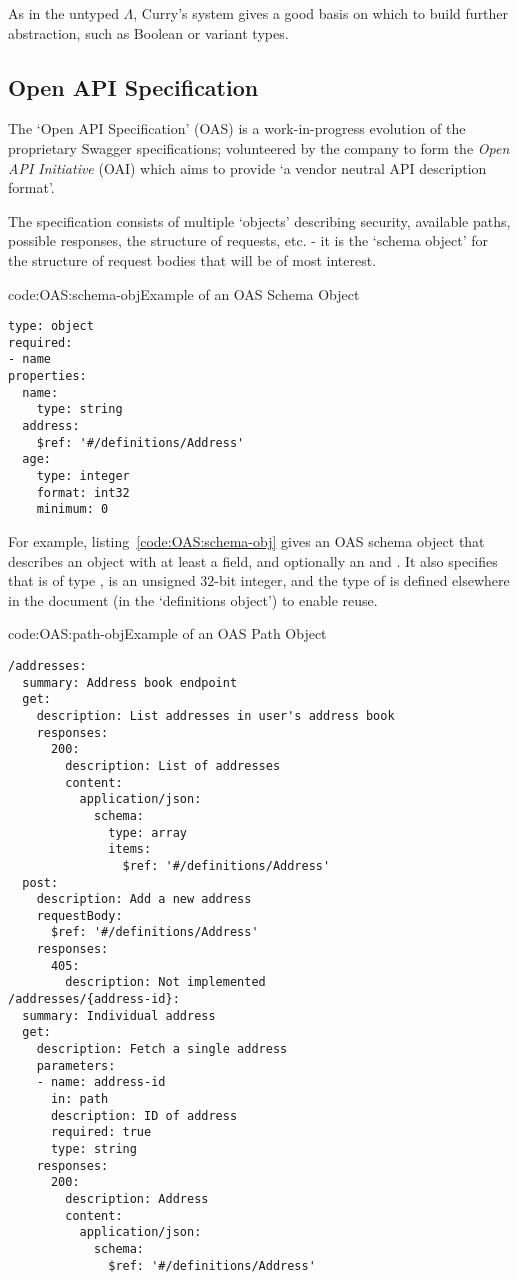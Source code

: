 As in the untyped $\Lambda$, Curry's system gives a good basis on which to build further abstraction, such as Boolean or variant types. \cite{tpl}

\subsection{Open API Specification}\label{bg:OAS}

The `Open API Specification' (OAS) is a work-in-progress evolution of the proprietary Swagger specifications; volunteered by the company to form the \emph{Open API Initiative} (OAI) which aims to provide `a vendor neutral API description format'. \cite{about_oai}

The specification consists of multiple `objects' describing security, available paths, possible responses, the structure of requests, etc. - it is the `schema object' for the structure of request bodies that will be of most interest.

\begin{codelisting}{code:OAS:schema-obj}{Example of an OAS Schema Object}
\begin{verbatim}
type: object
required:
- name
properties:
  name:
    type: string
  address:
    $ref: '#/definitions/Address'
  age:
    type: integer
    format: int32
    minimum: 0
\end{verbatim}
\end{codelisting}

For example, listing~\ref{code:OAS:schema-obj} gives an OAS schema object that describes an object with at least a  field, and optionally an  and . It also specifies that  is of type ,  is an unsigned $32$-bit integer, and the type of  is defined elsewhere in the document (in the `definitions object') to enable reuse.

\begin{codelisting}{code:OAS:path-obj}{Example of an OAS Path Object}
\begin{verbatim}
/addresses:
  summary: Address book endpoint
  get:
    description: List addresses in user's address book
    responses:
      200:
        description: List of addresses
        content:
          application/json:
            schema:
              type: array
              items:
                $ref: '#/definitions/Address' 
  post:
    description: Add a new address
    requestBody:
      $ref: '#/definitions/Address'
    responses:
      405:
        description: Not implemented
/addresses/{address-id}:
  summary: Individual address
  get:
    description: Fetch a single address
    parameters:
    - name: address-id
      in: path
      description: ID of address
      required: true
      type: string
    responses:
      200:
        description: Address
        content:
          application/json:
            schema:
              $ref: '#/definitions/Address'
\end{verbatim}
\end{codelisting}

